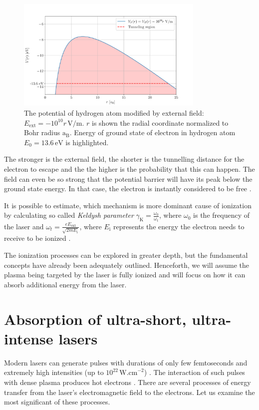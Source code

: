 \begin{figure}[h]
	\centering
	\includegraphics[width=0.8\textwidth]{figures/tunnelling}
	\caption{The potential of hydrogen atom modified by external field: $E_{\mathrm{ext}} = -10^{10}r\,\mathrm{V/m}$. $r$ is shown the radial coordinate normalized to Bohr radius $\mathrm{a_B}$. Energy of ground state of electron in hydrogen atom $E_0 = 13.6\, \mathrm{eV}$ is highlighted.}
	\label{fig:tunnelling}
\end{figure}

The stronger is the external field, the shorter is the tunnelling distance for the electron to escape and the the higher is the probability that this can happen. The field can even be so strong that the potential barrier will have its peak below the ground state energy. In that case, the electron is instantly considered to be free \cite{laser-plasma1}. 

It is possible to estimate, which mechanism is more dominant cause of ionization by calculating so called \textit{Keldysh parameter} $\gamma_\mathrm{K} = \frac{\omega_0}{\omega_t}$, where $\omega_0$ is the frequency of the laser and $\omega_t = \frac{eE_{\mathrm{ext}}}{\sqrt{2mE_\mathrm{i}}}$, where $E_\mathrm{i}$ represents the energy the electron needs to receive to be ionized \cite{laser-plasma1}.

The ionization processes can be explored in greater depth, but the fundamental concepts have already been adequately outlined. Henceforth, we will assume the plasma being targeted by the laser is fully ionized and will focus on how it can absorb additional energy from the laser.

\section{Absorption of ultra-short, ultra-intense lasers}
Modern lasers can generate pulses with durations of only few femtoseconds and extremely high intensities (up to 
$10^{22}\,\mathrm{W.cm}^{-2}$) \cite{absorption2,ultra-laser}. The interaction of such pulses with dense plasma produces hot electrons \cite{laser-plasma5}. There are several processes of energy transfer from the laser's electromagnetic field to the electrons. Let us examine the most significant of these processes.

